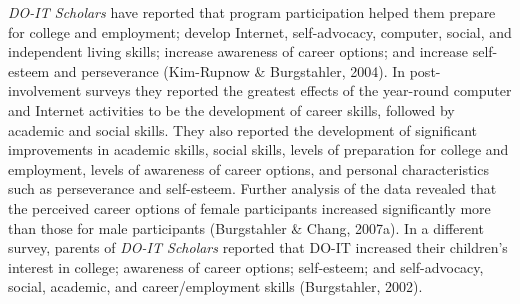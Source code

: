 \documentclass[11.5pt]{sig-alternate} %
\begin{document}
\begin{large}
\textit{DO-IT Scholars} have reported that program participation helped them prepare for college and employment; develop Internet, self-advocacy, computer, social, and independent living skills; increase awareness of career options; and increase self-esteem and perseverance (Kim-Rupnow \& Burgstahler, 2004). In post-involvement surveys they reported the greatest effects of the year-round computer and Internet activities to be the development of career skills, followed by academic and social skills. They also reported the development of significant improvements in academic skills, social skills, levels of preparation for college and employment, levels of awareness of career options, and personal characteristics such as perseverance and self-esteem. Further analysis of the data revealed that the perceived career options of female participants increased significantly more than those for male participants (Burgstahler \& Chang, 2007a). In a different survey, parents of \textit{DO-IT Scholars} reported that DO-IT increased their children's interest in college; awareness of career options; self-esteem; and self-advocacy, social, academic, and career/employment skills (Burgstahler, 2002).


\end{large}
\end{document}
